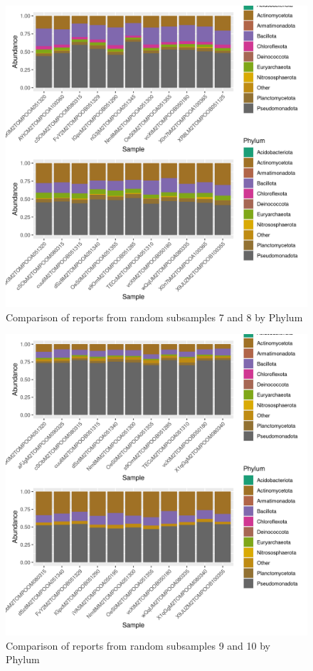 \documentclass{article}
\begin{document}
\begin{figure}
\centering
\includegraphics[scale=0.8]{otus_centrales_tomate_aleatorio1_7.csv_otus_centrales_tomate_aleatorio1_8.csv_relative_abundance_Phylum.png}
\caption{Comparison of reports from random subsamples 7 and 8 by Phylum}
\end{figure}


\begin{figure}
\centering
\includegraphics[scale=0.8]{otus_centrales_tomate_aleatorio1_1.csv_otus_centrales_tomate_aleatorio1_2.csv_relative_abundance_Phylum.png}
\caption{Comparison of reports from random subsamples 9 and 10 by Phylum}
\end{figure}
\end{document}
